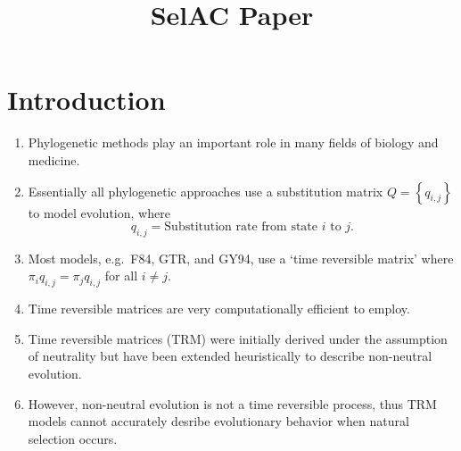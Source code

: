 \documentclass{article}
\title{SelAC Paper}
\date{}
\newcommand{\qij}{\ensuremath{q_{i,j}}\xspace}
\newcommand{\qji}{\ensuremath{q_{i,j}}\xspace}
\begin{document}
\maketitle

\section*{Introduction}
\begin{enumerate}
\item Phylogenetic methods play an important role in many fields of biology and medicine.
\item Essentially all phylogenetic approaches use a substitution matrix $Q = \left\{\qij\right\}$  to model evolution, where
  \begin{equation*}
   \qij  = \text{Substitution rate from state $i$ to $j$.}
  \end{equation*}
\item Most models, e.g.~F84, GTR, and GY94, use a `time reversible matrix' where $\pi_i \qij = \pi_j \qji $ for all $i \neq j$.
\item Time reversible matrices are very computationally efficient to employ.
\item Time reversible matrices (TRM) were initially derived under the assumption of neutrality but have been extended heuristically to describe non-neutral evolution.
\item However, non-neutral evolution is not a time reversible process, thus TRM models cannot accurately desribe evolutionary behavior when natural selection occurs.
\end{enumerate}
\end{document}
